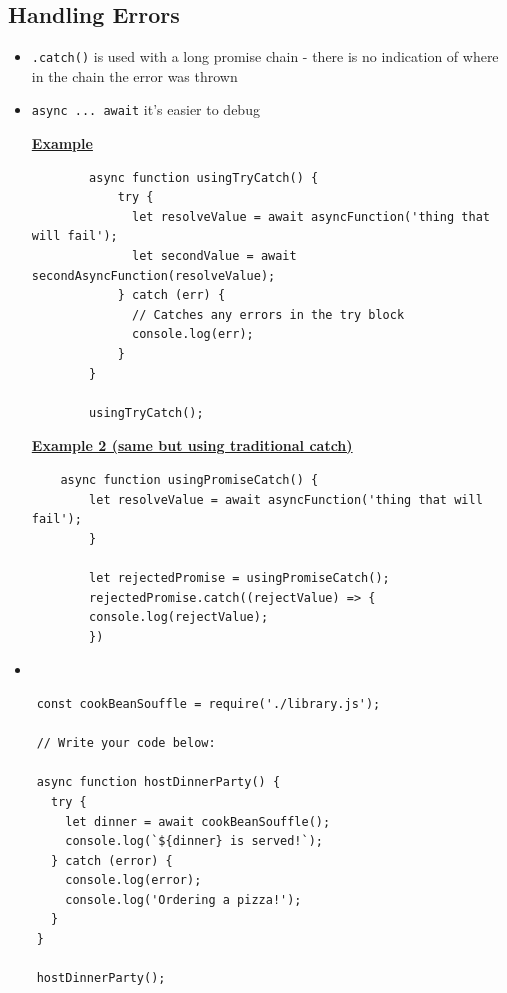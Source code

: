 \documentclass[12pt]{article}
\begin{document}
\subsection{Handling Errors}
\begin{itemize}
    \item \texttt{.catch()} is used with a long promise chain - there is no
    indication of where in the chain the error was thrown
    \item \texttt{async ... await} it's easier to debug

    \underline{\textbf{Example}}

    \begin{lstlisting}
        async function usingTryCatch() {
            try {
              let resolveValue = await asyncFunction('thing that will fail');
              let secondValue = await secondAsyncFunction(resolveValue);
            } catch (err) {
              // Catches any errors in the try block
              console.log(err);
            }
        }

        usingTryCatch();
    \end{lstlisting}

    \underline{\textbf{Example 2 (same but using traditional catch)}}


    \begin{lstlisting}
    async function usingPromiseCatch() {
        let resolveValue = await asyncFunction('thing that will fail');
        }

        let rejectedPromise = usingPromiseCatch();
        rejectedPromise.catch((rejectValue) => {
        console.log(rejectValue);
        })
    \end{lstlisting}

    \item
\end{itemize}

\begin{lstlisting}
    const cookBeanSouffle = require('./library.js');

    // Write your code below:

    async function hostDinnerParty() {
      try {
        let dinner = await cookBeanSouffle();
        console.log(`${dinner} is served!`);
      } catch (error) {
        console.log(error);
        console.log('Ordering a pizza!');
      }
    }

    hostDinnerParty();
\end{lstlisting}
\end{document}
